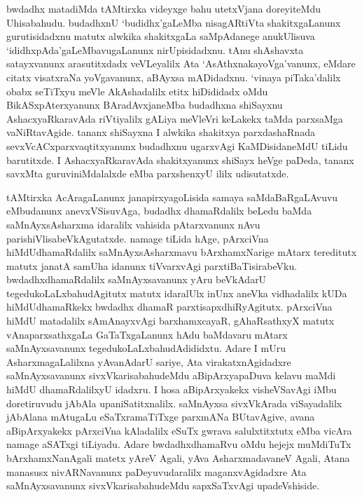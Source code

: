 bwdadhx matadiMda tAMtirxka videyxge bahu utetxVjana doreyiteMdu Uhisabahudu. budadhxnU `budidhx'gaLeMba nisagARtiVta shakitxgaLanunx gurutisidadxnu matutx alwkika shakitxgaLa saMpAdanege anukUlisuva `ididhxpAda'gaLeMbavugaLanunx nirUpisidadxnu. tAnu shAshavxta satayxvanunx arasutitxdadx veVLeyalilx Ata `AsAthxnakayoVga'vanunx, eMdare citatx visatxraNa yoVgavanunx, aBAyxsa mADidadxnu. `vinaya piTaka'dalilx obabx seTiTxyu meVle AkAshadalilx etitx hiDididadx oMdu BikASxpAterxyanunx BAradAvxjaneMba budadhxna shiSayxnu AshacxyaRkaravAda riVtiyalilx gALiya meVleVri keLakekx taMda parxsaMga vaNiRtavAgide. tananx shiSayxna I alwkika shakitxya parxdashaRnada sevxVcACxparxvaqtitxyanunx budadhxnu ugarxvAgi KaMDisidaneMdU tiLidu barutitxde. I AshacxyaRkaravAda shakitxyanunx shiSayx heVge paDeda, tananx savxMta guruviniMdalalxde eMba parxshenxyU ililx udisutatxde.

tAMtirxka AcAragaLanunx janapirxyagoLisida samaya saMdaBaRgaLAvuvu eMbu\-danunx anevxVSisuvAga, budadhx dhamaRdalilx beLedu baMda saMnAyxsAsharxma idaralilx vahisida pAtarxvanunx nAvu parishiVlisabeVkAgutatxde. namage tiLida hAge, pArxciVna hiMdUdhamaRdalilx saMnAyxsAsharxmavu bArxhamxNarige mAtarx tereditutx matutx janatA samUha idanunx tiVvarxvAgi parxtiBaTisirabeVku. bwdadhxdhamaRdalilx saMnAyxsavanunx yAru beVkAdarU tegedukoLaLxbahudAgitutx matutx idaralUlx inUnx aneVka vidhadalilx kUDa hiMdUdhamaRkekx bwdadhx dhamaR parxtisapxdhiRyAgitutx. pArxciVna hiMdU matadalilx sAmAnayxvAgi barxhamxcayaR, gAhaRsathxyX matutx vAnaparxsathxgaLa GaTaTxgaLanunx hAdu baMdavaru mAtarx saMnAyxsavanunx tegedukoLaLxbahudAdididxtu. Adare I mUru AsharxmagaLalilxna yAvanAdarU sariye, Ata virakatxnAgidadxre saMnAyxsavanunx sivxVkarisabahudeMdu aBipArxyapaDuva kelavu maMdi hiMdU dhamaRdalilxyU idadxru. I hosa aBipArxyakekx visheVSavAgi iMbu doretiruvudu jAbAla upaniSatitxnalilx. saMnAyxsa sivxVkArada viSayadalilx jAbAlana mAtugaLu eSaTxramaTiTxge parxmANa BUtavAgive, avana aBipArxyakekx pArxciVna kAladalilx eSuTx gwrava salulxtitxtutx eMba vicAra namage aSATxgi tiLiyadu. Adare bwdadhxdhamaRvu oMdu hejejx muMdiTuTx bArxhamxNanAgali matetx yAreV Agali, yAva AsharxmadavaneV Agali, Atana manasusx nivARNavanunx paDeyuvudaralilx maganxvAgidadxre Ata saMnAyxsavanunx sivxVkarisabahudeMdu sapxSaTxvAgi upadeVshiside.

